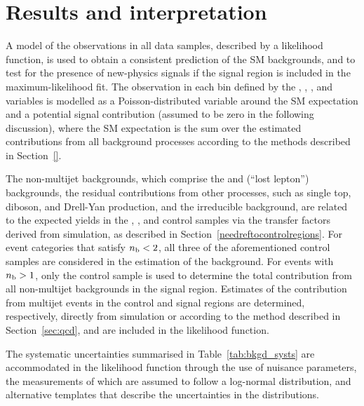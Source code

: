 \clearpage
\section{Results and interpretation}
\label{sec:result}

A model of the observations in all data samples, described by a
likelihood function, is used to obtain a consistent prediction of the
SM backgrounds, and to test for the presence of new-physics signals if
the signal region is included in the maximum-likelihood fit. The
observation in each bin defined by the \njet, \nb, \scalht, and \mht
variables is modelled as a Poisson-distributed variable around the SM
expectation and a potential signal contribution (assumed to be zero in
the following discussion), where the SM expectation is the sum over
the estimated contributions from all background processes according to
the methods described in Section~\ref{}. 

The non-multijet backgrounds, which comprise the \wlj and \ttj (``lost
lepton'') backgrounds, the residual contributions from other
processes, such as single top, diboson, and Drell-Yan production, and
the irreducible \znunuj background, are related to the expected yields
in the \mj, \mmj, and \gj control samples via the transfer factors
derived from simulation, as described in
Section~\ref{needreftocontrolregions}. For event categories that
satisfy $n_{\text{b}} < 2$, all three of the aforementioned control samples are
considered in the estimation of the \znunuj background. For events
with $n_{\text{b}} > 1$, only the \mj control sample is used to determine the
total contribution from all non-multijet backgrounds in the signal
region. 
Estimates of the contribution from multijet events in the control and
signal regions are determined, respectively, directly from simulation
or according to the method described in Section~\ref{sec:qcd}, and are
included in the likelihood function.

The systematic uncertainties summarised in Table~\ref{tab:bkgd_systs}
are accommodated in the likelihood function through the use of
nuisance parameters, the measurements of which are assumed to follow a
log-normal distribution, and alternative templates that describe the
uncertainties in the \mht distributions.

